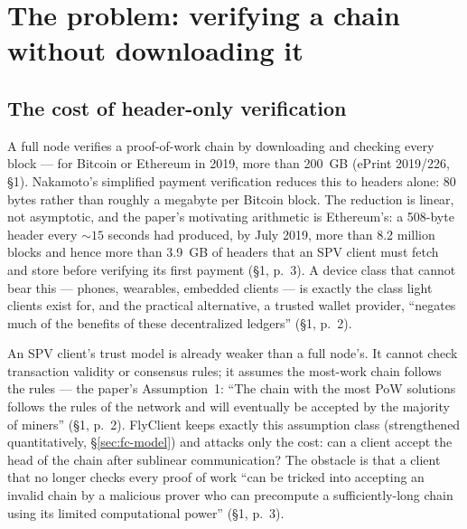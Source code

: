 \documentclass[11pt,a4paper]{article}
\theoremstyle{definition}
\begin{document}
\section{The problem: verifying a chain without downloading it}
\label{sec:fc-problem}

\subsection{The cost of header-only verification}\label{sec:fc-spv}

A full node verifies a proof-of-work chain by downloading and checking every
block --- for Bitcoin or Ethereum in 2019, more than 200~GB (ePrint
2019/226, \S1). Nakamoto's simplified payment verification reduces this to
headers alone: 80 bytes rather than roughly a megabyte per Bitcoin block.
The reduction is linear, not asymptotic, and the paper's motivating
arithmetic is Ethereum's: a 508-byte header every ${\sim}15$ seconds had
produced, by July 2019, more than 8.2 million blocks and hence more than
3.9~GB of headers that an SPV client must fetch and store before verifying
its first payment (\S1, p.~3). A device class that cannot bear this ---
phones, wearables, embedded clients --- is exactly the class light clients
exist for, and the practical alternative, a trusted wallet provider,
``negates much of the benefits of these decentralized ledgers'' (\S1,
p.~2).

An SPV client's trust model is already weaker than a full node's. It cannot
check transaction validity or consensus rules; it assumes the most-work
chain follows the rules --- the paper's Assumption~1: ``The chain with the
most PoW solutions follows the rules of the network and will eventually be
accepted by the majority of miners'' (\S1, p.~2). FlyClient keeps exactly
this assumption class (strengthened quantitatively, \S\ref{sec:fc-model})
and attacks only the cost: can a client accept the head of the chain after
sublinear communication? The obstacle is that a client that no longer checks
every proof of work ``can be tricked into accepting an invalid chain by a
malicious prover who can precompute a sufficiently-long chain using its
limited computational power'' (\S1, p.~3).
\end{document}
